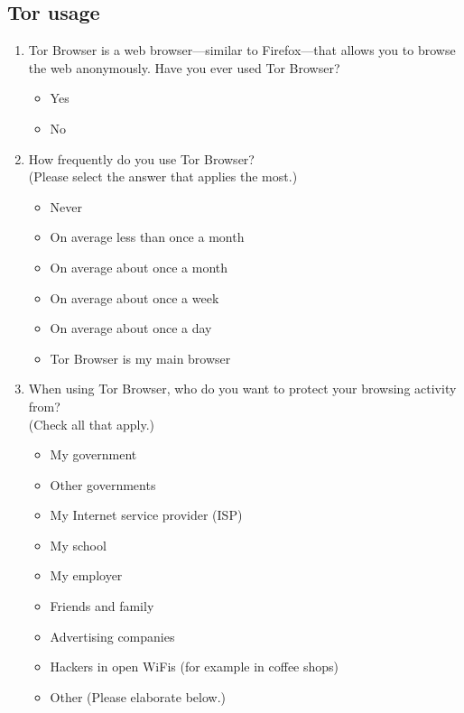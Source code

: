 \subsection{Tor usage}
\begin{enumerate}
    \item Tor Browser is a web browser---similar to Firefox---that allows you
        to browse the web anonymously. Have you ever used Tor Browser?
        \begin{itemize}[label=$\Circle$]
            \item Yes
            \item No
        \end{itemize}

    \item How frequently do you use Tor Browser?\\(Please select the answer
        that applies the most.)
        \begin{itemize}[label=$\Circle$]
            \item Never
            \item On average less than once a month
            \item On average about once a month
            \item On average about once a week
            \item On average about once a day
            \item Tor Browser is my main browser
        \end{itemize}

    \item When using Tor Browser, who do you want to protect your browsing
        activity from?\\(Check all that apply.)
        \begin{itemize}[label=$\Square$]
            \item My government
            \item Other governments
            \item My Internet service provider (ISP)
            \item My school
            \item My employer
            \item Friends and family
            \item Advertising companies
            \item Hackers in open WiFis (for example in coffee shops)
            \item Other (Please elaborate below.)
        \end{itemize}


\end{enumerate}
